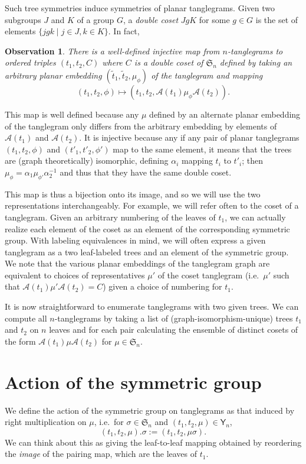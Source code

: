 \documentclass{amsart}
\newtheorem{observation}{Observation}
\newcommand{\fS}{\mathfrak S}
\newcommand{\aut}{\mathcal A}
\newcommand{\pairing}{\mu}
\newcommand{\tangle}{\mathsf{Y}}
\begin{document}
Such tree symmetries induce symmetries of planar tanglegrams.
Given two subgroups $J$ and $K$ of a group $G$, a \emph{double coset} $JgK$ for some $g \in G$ is the set of elements $\{jgk \mid j \in J, k \in K\}$.
In fact,
\begin{observation}
There is a well-defined injective map from $n$-tanglegrams to ordered triples $(t_1, t_2, C)$ where $C$ is a double coset of $\fS_n$ defined by taking an arbitrary planar embedding $(\tilde t_1, \tilde t_2, \pairing_\phi)$ of the tanglegram and mapping
\[
(t_1, t_2, \phi) \mapsto (t_1, t_2, \aut(t_1) \pairing_\phi \aut(t_2)).
\]
\end{observation}
This map is well defined because any $\pairing$ defined by an alternate planar embedding of the tanglegram only differs from the arbitrary embedding by elements of $\aut(t_1)$ and $\aut(t_2)$.
It is injective because any if any pair of planar tanglegrams $(t_1, t_2, \phi)$ and $(t'_1, t'_2, \phi')$ map to the same element, it means that the trees are (graph theoretically) isomorphic, defining $\alpha_i$ mapping $t_i$ to $t'_i$; then $\pairing_\phi = \alpha_1 \pairing_{\phi'} \alpha_2^{-1}$ and thus that they have the same double coset.

This map is thus a bijection onto its image, and so we will use the two representations interchangeably.
For example, we will refer often to the coset of a tanglegram.
Given an arbitrary numbering of the leaves of $t_1$, we can actually realize each element of the coset as an element of the corresponding symmetric group.
With labeling equivalences in mind, we will often express a given tanglegram as a two leaf-labeled trees and an element of the symmetric group.
We note that the various planar embeddings of the tanglegram graph are equivalent to choices of representatives $\pairing'$ of the coset tanglegram (i.e.\ $\pairing'$ such that $\aut(t_1) \pairing' \aut(t_2) = C$) given a choice of numbering for $t_1$.

It is now straightforward to enumerate tanglegrams with two given trees.
We can compute all $n$-tanglegrams by taking a list of (graph-isomorphism-unique) trees $t_1$ and $t_2$ on $n$ leaves and for each pair calculating the ensemble of distinct cosets of the form $\aut(t_1) \pairing \aut(t_2)$ for $\pairing \in \fS_n$.


\section{Action of the symmetric group}
We define the action of the symmetric group on tanglegrams as that induced by right multiplication on $\pairing$, i.e.\ for $\sigma \in \fS_n$ and $(t_1, t_2, \pairing) \in \tangle_n$,
\[
(t_1, t_2, \pairing) . \sigma := (t_1, t_2, \pairing \sigma).
\]
We can think about this as giving the leaf-to-leaf mapping obtained by reordering the \emph{image} of the pairing map, which are the leaves of $t_1$.
\end{document}
